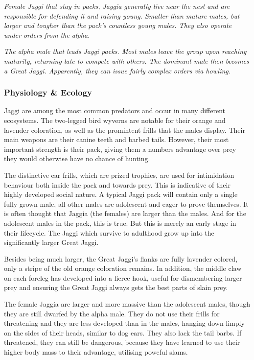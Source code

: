 \textit{Female Jaggi that stay in packs, Jaggia generally live near the nest and are responsible for defending it and raising young. Smaller than mature males, but larger and tougher than the pack's countless young males. They also operate under orders from the alpha.}

\textit{The alpha male that leads Jaggi packs. Most males leave the group upon reaching maturity, returning late to compete with others. The dominant male then becomes a Great Jaggi. Apparently, they can issue fairly complex orders via howling.}

\subsubsection{Physiology \& Ecology}
Jaggi are among the most common predators and occur in many different ecosystems. The two-legged bird wyverns are notable for their orange and lavender coloration, as well as the promintent frills that the males display. Their main weapons are their canine teeth and barbed tails. However, their most important strength is their pack, giving them a numbers advantage over prey they would otherwise have no chance of hunting.

The distinctive ear frills, which are prized trophies, are used for intimidation behaviour both inside the pack and towards prey. This is indicative of their highly developed social nature. A typical Jaggi pack will contain only a single fully grown male, all other males are adolescent and eager to prove themselves. It is often thought that Jaggia (the females) are larger than the males. And for the adolescent males in the pack, this is true. But this is merely an early stage in their lifecycle. The Jaggi which survive to adulthood grow up into the significantly larger Great Jaggi.

Besides being much larger, the Great Jaggi's flanks are fully lavender colored, only a stripe of the old orange coloration remains. In addition, the middle claw on each foreleg has developed into a fierce hook, useful for dismembering larger prey and ensuring the Great Jaggi always gets the best parts of slain prey.

The female Jaggia are larger and more massive than the adolescent males, though they are still dwarfed by the alpha male. They do not use their frills for threatening and they are less developed than in the males, hanging down limply on the sides of their heads, similar to dog ears. They also lack the tail barbs. If threatened, they can still be dangerous, because they have learned to use their higher body mass to their advantage, utilising poweful slams.

